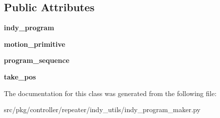 \subsection*{Public Attributes}
\begin{DoxyCompactItemize}
\item 
\mbox{\label{classrnb-planning_1_1src_1_1pkg_1_1controller_1_1repeater_1_1indy__utils_1_1indy__program__maker_1_1_pick_n_place_a0978f857b530f1a4ecfe1e49c52b6dc0}} 
{\bfseries indy\+\_\+program}
\item 
\mbox{\label{classrnb-planning_1_1src_1_1pkg_1_1controller_1_1repeater_1_1indy__utils_1_1indy__program__maker_1_1_pick_n_place_a86d6f15e8c5fd9c23c7b215c50f90846}} 
{\bfseries motion\+\_\+primitive}
\item 
\mbox{\label{classrnb-planning_1_1src_1_1pkg_1_1controller_1_1repeater_1_1indy__utils_1_1indy__program__maker_1_1_pick_n_place_a35ad562d9ee59103c3dfce890fa3afc1}} 
{\bfseries program\+\_\+sequence}
\item 
\mbox{\label{classrnb-planning_1_1src_1_1pkg_1_1controller_1_1repeater_1_1indy__utils_1_1indy__program__maker_1_1_pick_n_place_a5bd89a70b7eaa8ab5a36323d6040fcc6}} 
{\bfseries take\+\_\+pos}
\end{DoxyCompactItemize}


The documentation for this class was generated from the following file\+:\begin{DoxyCompactItemize}
\item 
src/pkg/controller/repeater/indy\+\_\+utils/indy\+\_\+program\+\_\+maker.\+py\end{DoxyCompactItemize}
